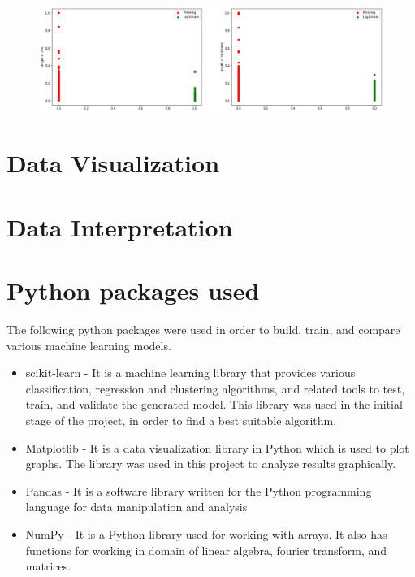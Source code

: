 \documentclass[letterpaper, 28pt, fleqn]{article}
\begin{document}
\begin{multicols}{2}
\begin{figure}
  \includegraphics[width=\linewidth]{scatter_plot_1}
  \label{fig:scatter1}
\end{figure}


\section{Data Visualization}



\section{Data Interpretation}



\section{Python packages used}

The following python packages were used in order to build, train, and compare various machine learning models. 

\begin{itemize}
\item scikit-learn - It is a machine learning library that provides various classification, regression and clustering algorithms, and related tools to test, train, and validate the generated model. This library was used in the initial stage  of the project, in order to find a best suitable algorithm.
\item Matplotlib - It is a data visualization library in Python which is used to plot graphs. The library was used in this project to analyze results graphically. 
\item Pandas - It is a software library written for the Python programming language for data manipulation and analysis
\item NumPy - It is a Python library used for working with arrays. It also has functions for working in domain of linear algebra, fourier transform, and matrices.


\end{itemize}
\end{multicols}
\end{document}
